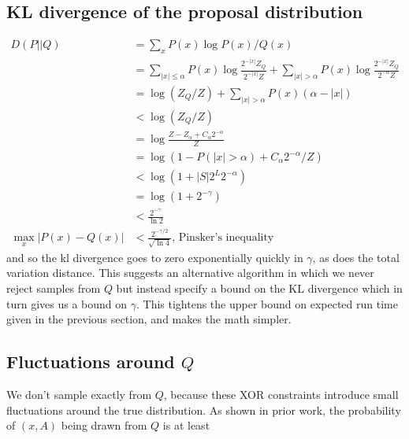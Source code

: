 \documentclass{article}
\begin{document}
\subsection{KL divergence of the proposal distribution}
\begin{align}
  D(P||Q)& = \sum_x P(x)\log P(x)/Q(x)\\
  & = \sum_{|x|\leq \alpha} P(x)\log \frac{2^{-|x|}Z_Q}{2^{-|x|}Z} + \sum_{|x| > \alpha}P(x)\log \frac{2^{-|x|}Z_Q}{2^{-\alpha}Z}\\
  & = \log (Z_Q/Z) + \sum_{|x| > \alpha} P(x)(\alpha - |x|)\\
  & < \log (Z_Q/Z)\\
  & = \log \frac{Z - Z_\alpha + C_\alpha2^{-\alpha}}{Z}\\
  & = \log (1 - P(|x| > \alpha) + C_\alpha2^{-\alpha}/Z)\\
  & < \log (1 + |S|2^{L}2^{ - \alpha})\\
  & = \log (1 + 2^{ - \gamma})\\
  & < \frac{2^{-\gamma}}{\ln 2}\\
  \max_x |P(x) - Q(x)|& < \frac{2^{-\gamma/2}}{\sqrt{\ln 4}}\text{, Pinsker's inequality}
\end{align}
and so the kl divergence goes to zero exponentially quickly in $\gamma$, as does the total variation distance.
This suggests an alternative algorithm in which we never reject samples from $Q$ but instead specify a bound on the KL divergence which in turn gives us a bound on  $\gamma$.
This tightens the upper bound on expected run time given in the previous section, and makes the math simpler.

\subsection{Fluctuations around $Q$}
We don't sample exactly from $Q$, because these XOR constraints introduce small fluctuations around the true distribution.
As shown in prior work, the probability of $(x,A)$ being drawn from $Q$ is at least
\begin{align}
  
\end{align}
\end{document}
